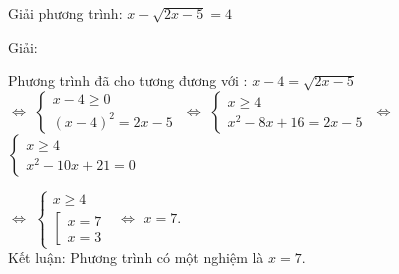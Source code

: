           \begin{vd}
            Giải phương trình: $ x - \sqrt{2x -5} =4 $

          \end{vd}
          \begin{center}

            Giải:
         \end{center}
         
         Phương trình đã cho tương đương với : $ x - 4 = \sqrt{2x-5} $ \\
         $ \Leftrightarrow $
         $
            \begin{cases}
                x - 4 \geq 0 \\
                (x-4)^2 = 2x -5
            \end{cases}
         $
         $ \Leftrightarrow $
         $
            \begin{cases}
                x  \geq 4 \\
                x^2 -8x + 16 = 2x -5
            \end{cases}
         $
         $ \Leftrightarrow $
         $
            \begin{cases}
                x  \geq 4 \\
                x^2 -10x + 21 = 0
              \end{cases}
         $

         $ \Leftrightarrow $
         $
            \begin{cases}
                x  \geq 4 \\
                \left[
                  \begin{array} {l}
                     x = 7 \\ x=3
                  \end{array}
                \right.
              \end{cases}
         $
         $ \Leftrightarrow $
         $
              x =7.
         $
\\         Kết luận: Phương trình có một nghiệm là $ x=7 $.
